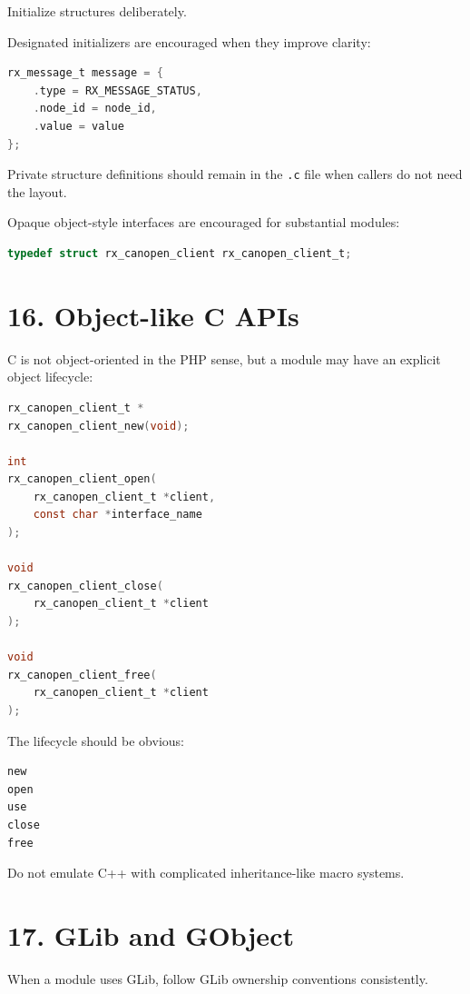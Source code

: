\documentclass[11pt,a4paper]{article}
\begin{document}
Initialize structures deliberately.

Designated initializers are encouraged when they improve clarity:

\begin{lstlisting}[language=C]
rx_message_t message = {
    .type = RX_MESSAGE_STATUS,
    .node_id = node_id,
    .value = value
};
\end{lstlisting}

Private structure definitions should remain in the
\passthrough{\lstinline!.c!} file when callers do not need the layout.

Opaque object-style interfaces are encouraged for substantial modules:

\begin{lstlisting}[language=C]
typedef struct rx_canopen_client rx_canopen_client_t;
\end{lstlisting}

\section{16. Object-like C APIs}\label{16-object-like-c-apis}

C is not object-oriented in the PHP sense, but a module may have an
explicit object lifecycle:

\begin{lstlisting}[language=C]
rx_canopen_client_t *
rx_canopen_client_new(void);

int
rx_canopen_client_open(
    rx_canopen_client_t *client,
    const char *interface_name
);

void
rx_canopen_client_close(
    rx_canopen_client_t *client
);

void
rx_canopen_client_free(
    rx_canopen_client_t *client
);
\end{lstlisting}

The lifecycle should be obvious:

\begin{lstlisting}
new
open
use
close
free
\end{lstlisting}

Do not emulate C++ with complicated inheritance-like macro systems.

\section{17. GLib and GObject}\label{17-glib-and-gobject}

When a module uses GLib, follow GLib ownership conventions consistently.
\end{document}
